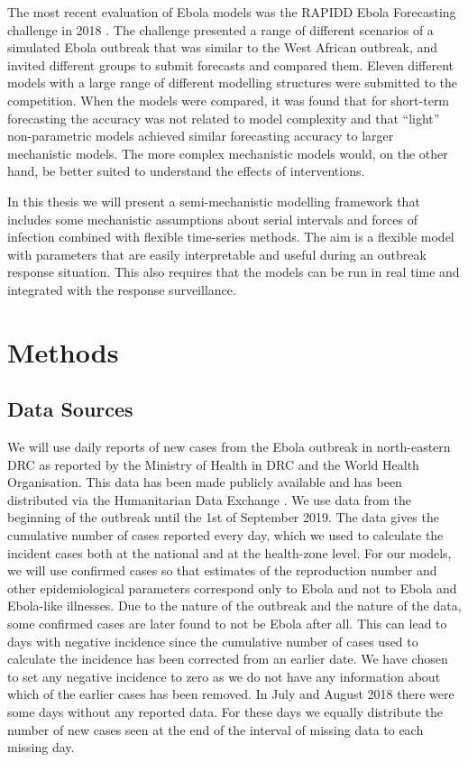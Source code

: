 \documentclass[12pt]{article}
\begin{document}
The most recent evaluation of Ebola models was the RAPIDD Ebola Forecasting challenge in 2018 \cite{viboudRAPIDDEbolaForecasting2018}. The challenge presented a range of different scenarios of a simulated Ebola outbreak that was similar to the West African outbreak, and invited different groups to submit forecasts and compared them. Eleven different models with a large range of different modelling structures were submitted to the competition. When the models were compared, it was found that for short-term forecasting the accuracy was not related to model complexity and that ``light'' non-parametric models achieved similar forecasting accuracy to larger mechanistic models. The more complex mechanistic models would, on the other hand, be better suited to understand the effects of interventions. 

In this thesis we will present a semi-mechanistic modelling framework that includes some mechanistic assumptions about serial intervals and forces of infection combined with flexible time-series methods. The aim is a flexible model with parameters that are easily interpretable and useful during an outbreak response situation. This also requires that the models can be run in real time and integrated with the response surveillance. 

\section{Methods}

\subsection{Data Sources}

We will use daily reports of new cases from the Ebola outbreak in north-eastern DRC as reported by the Ministry of Health in DRC and the World Health Organisation. This data has been made publicly available and has been distributed via the Humanitarian Data Exchange \cite{hummanitariandataexchangeEbolaCasesDeaths}. We use data from the beginning of the outbreak until the 1st of September 2019. The data gives the cumulative number of cases reported every day, which we used to calculate the incident cases both at the national and at the health-zone level. For our models, we will use confirmed cases so that estimates of the reproduction number and other epidemiological parameters correspond only to Ebola and not to Ebola and Ebola-like illnesses. Due to the nature of the outbreak and the nature of the data, some confirmed cases are later found to not be Ebola after all. This can lead to days with negative incidence since the cumulative number of cases used to calculate the incidence has been corrected from an earlier date. We have chosen to set any negative incidence to zero as we do not have any information about which of the earlier cases has been removed. In July and August 2018 there were some days without any reported data. For these days we equally distribute the number of new cases seen at the end of the interval of missing data to each missing day.
\end{document}

